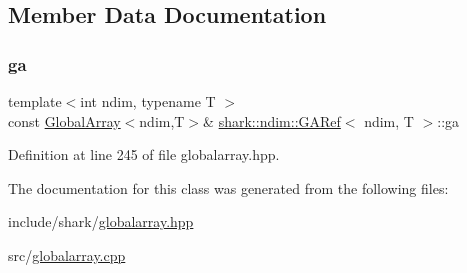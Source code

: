 \subsection{Member Data Documentation}
\hypertarget{classshark_1_1ndim_1_1_g_a_ref_ad52c83aede31478298662b70dcc781d7}{}\label{classshark_1_1ndim_1_1_g_a_ref_ad52c83aede31478298662b70dcc781d7} 
\subsubsection{\texorpdfstring{ga}{ga}}
{\footnotesize\ttfamily template$<$int ndim, typename T $>$ \\
const \hyperlink{classshark_1_1ndim_1_1_global_array}{Global\+Array}$<$ndim,T$>$\& \hyperlink{classshark_1_1ndim_1_1_g_a_ref}{shark\+::ndim\+::\+G\+A\+Ref}$<$ ndim, T $>$\+::ga\hspace{0.3cm}{\ttfamily [private]}}



Definition at line 245 of file globalarray.\+hpp.



The documentation for this class was generated from the following files\+:\begin{DoxyCompactItemize}
\item 
include/shark/\hyperlink{globalarray_8hpp}{globalarray.\+hpp}\item 
src/\hyperlink{globalarray_8cpp}{globalarray.\+cpp}\end{DoxyCompactItemize}
